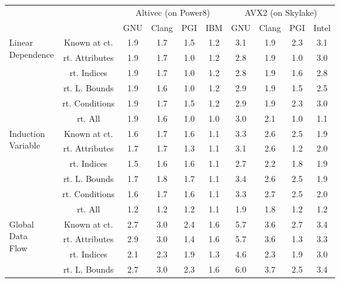 \documentclass{article}
\begin{document}
\begin{longtable}{|p{2cm}|c|c|c|c|c|c|c|c|c|}
\cline{3-10} \multicolumn{2}{c|}{} & \multicolumn{4}{|c|}{ Altivec (on Power8)} & \multicolumn{4}{|c|}{ AVX2 (on Skylake)} \\
\cline{3-10} \multicolumn{2}{c|}{}& GNU & Clang & PGI & IBM & GNU & Clang & PGI & Intel \\ \hline
\multirow{6}{*}{ \parbox{2cm}{Linear\\Dependence}} & Known at ct. & 1.9 & 1.7 & 1.5 & 1.2 & 3.1 & 1.9 & 2.3 & 3.1\\ \cline{2-10}
 & rt. Attributes & 1.9 & 1.7 & 1.0 & 1.2 & 2.8 & 1.9 & 1.0 & 3.0\\ \cline{2-10}
 & rt. Indices & 1.9 & 1.7 & 1.0 & 1.2 & 2.8 & 1.9 & 1.6 & 2.8\\ \cline{2-10}
 & rt. L. Bounds & 1.9 & 1.6 & 1.0 & 1.2 & 2.9 & 1.9 & 1.5 & 2.5\\ \cline{2-10}
 & rt. Conditions & 1.9 & 1.7 & 1.5 & 1.2 & 2.9 & 1.9 & 2.3 & 3.0\\ \cline{2-10}
 & rt. All & 1.9 & 1.6 & 1.0 & 1.0 & 3.0 & 2.1 & 1.0 & 1.1\\ \cline{2-10}
\hline
\multirow{6}{*}{ \parbox{2cm}{Induction\\Variable}} & Known at ct. & 1.6 & 1.7 & 1.6 & 1.1 & 3.3 & 2.6 & 2.5 & 1.9\\ \cline{2-10}
 & rt. Attributes & 1.7 & 1.7 & 1.3 & 1.1 & 3.1 & 2.6 & 1.2 & 2.0\\ \cline{2-10}
 & rt. Indices & 1.5 & 1.6 & 1.6 & 1.1 & 2.7 & 2.2 & 1.8 & 1.9\\ \cline{2-10}
 & rt. L. Bounds & 1.7 & 1.8 & 1.7 & 1.1 & 3.4 & 2.6 & 2.5 & 1.9\\ \cline{2-10}
 & rt. Conditions & 1.6 & 1.7 & 1.6 & 1.1 & 3.3 & 2.7 & 2.5 & 2.0\\ \cline{2-10}
 & rt. All & 1.2 & 1.2 & 1.2 & 1.1 & 1.9 & 1.8 & 1.2 & 1.2\\ \cline{2-10}
\hline
\multirow{6}{*}{ \parbox{2cm}{Global\\Data\\Flow}} & Known at ct. & 2.7 & 3.0 & 2.4 & 1.6 & 5.7 & 3.6 & 2.7 & 3.4\\ \cline{2-10}
 & rt. Attributes & 2.9 & 3.0 & 1.4 & 1.6 & 5.7 & 3.6 & 1.3 & 3.3\\ \cline{2-10}
 & rt. Indices & 2.1 & 2.3 & 1.9 & 1.3 & 4.6 & 2.3 & 1.9 & 3.0\\ \cline{2-10}
 & rt. L. Bounds & 2.7 & 3.0 & 2.3 & 1.6 & 6.0 & 3.7 & 2.5 & 3.4\\ \cline{2-10}

\end{longtable}
\end{document}
